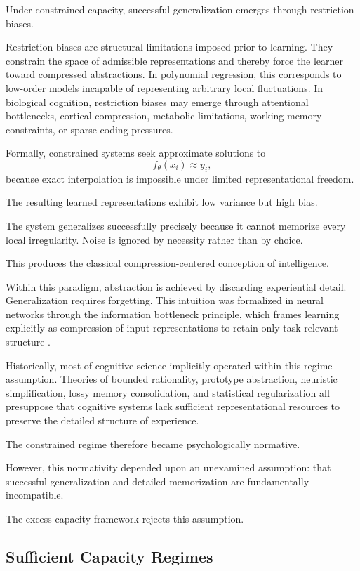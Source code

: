 \documentclass[12pt,a4paper]{article}
\begin{document}
Under constrained capacity, successful generalization emerges through restriction biases.

Restriction biases are structural limitations imposed prior to learning. They constrain the space of admissible representations and thereby force the learner toward compressed abstractions. In polynomial regression, this corresponds to low-order models incapable of representing arbitrary local fluctuations. In biological cognition, restriction biases may emerge through attentional bottlenecks, cortical compression, metabolic limitations, working-memory constraints, or sparse coding pressures.

Formally, constrained systems seek approximate solutions to
\[
f_\theta(x_i) \approx y_i,
\]
because exact interpolation is impossible under limited representational freedom.

The resulting learned representations exhibit low variance but high bias.

The system generalizes successfully precisely because it cannot memorize every local irregularity. Noise is ignored by necessity rather than by choice.

This produces the classical compression-centered conception of intelligence.

Within this paradigm, abstraction is achieved by discarding experiential detail. Generalization requires forgetting. This intuition was formalized in neural networks through the information bottleneck principle, which frames learning explicitly as compression of input representations to retain only task-relevant structure \cite{Tishby2015}.

Historically, most of cognitive science implicitly operated within this regime assumption. Theories of bounded rationality, prototype abstraction, heuristic simplification, lossy memory consolidation, and statistical regularization all presuppose that cognitive systems lack sufficient representational resources to preserve the detailed structure of experience.

The constrained regime therefore became psychologically normative.

However, this normativity depended upon an unexamined assumption: that successful generalization and detailed memorization are fundamentally incompatible.

The excess-capacity framework rejects this assumption.

\subsection{Sufficient Capacity Regimes}
\end{document}
